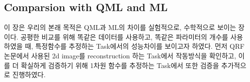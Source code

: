 %
%
\subsection{Comparsion with QML and ML} \label{qml:comparision}

이 장은 우리의 본래 목적은 QML과 ML의 차이를 실험적으로, 수학적으로 보이는 장이다. 공평한 비교를 위해 똑같은 데이터를 사용하고, 똑같은 파라미터의 개수를 사용하였을 때, 특정함수를 추정하는 Task에서의 성능차이를 보이고자 하였다. 먼저 QRF논문에서 사용된 2d image를 reconstruction 하는 Task에서 작동방식을 확인하고, 이를 더 확실하게 검증하기 위해 1차원 함수를 추정하는 Task에서 또한 검증을 추가적으로 진행하였다.
